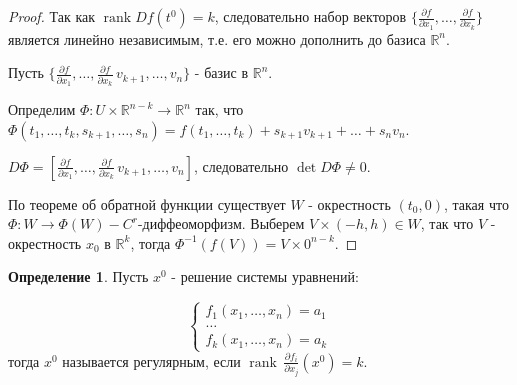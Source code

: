\documentclass[a5paper]{article}
\newcounter{through}
\theoremstyle{plain}
\theoremstyle{definition}
\newtheorem{definition}[through]{Определение}
\numberwithin{through}{section}
\numberwithin{equation}{section}
\DeclareMathOperator{\rank}{rank}
\begin{document}
\begin{proof}
	Так как $\rank Df(t^0) = k$, следовательно набор векторов $\{ \frac{\partial f}{ \partial x_1}, \ldots, \frac{\partial f}{\partial x_k}\}$  является линейно независимым, т.е. его можно дополнить до базиса $\mathbb{R}^n$.
	
	Пусть $\{ \frac{\partial f}{ \partial x_1}, \ldots, \frac{\partial f}{\partial x_k}\, v_{k+1}, \ldots, v_n\}$ - базис в $\mathbb{R}^n$.
	
	Определим $\Phi : U \times \mathbb{R}^{n-k} \to \mathbb{R}^n$ так, что $\Phi(t_1, \ldots, t_k, s_{k+1}, \ldots, s_n)=f(t_1, \ldots, t_k) +s_{k+1}v_{k+1} + \ldots + s_n v_n$.
	
	$D \Phi = [ \frac{\partial f}{ \partial x_1}, \ldots, \frac{\partial f}{\partial x_k}\, v_{k+1}, \ldots, v_n]$, следовательно $\det D \Phi \not= 0$.
	
	По теореме об обратной функции существует $W$ - окрестность $(t_0, 0)$, такая что $\Phi : W \to \Phi(W) - C^r$-диффеоморфизм. Выберем $V \times (-h, h) \in W$, так что $V$ - окрестность $x_0$ в $\mathbb{R}^k$, тогда $\Phi^{-1}(f(V))=V\times{0}^{n-k}$.
	
\end{proof}

\begin{definition}
	Пусть $x^0$ - решение системы уравнений:
	
	\begin{equation*}
	\begin{cases}
	f_1(x_1, \ldots, x_n) = a_1
	\\
	\ldots
	\\
	f_k(x_1, \ldots, x_n) = a_k
	\end{cases}
	\end{equation*}
	тогда $x^0$ называется регулярным, если 
	$\rank \, \frac{\partial f_i}{\partial x_j} (x^0) = k$.
\end{definition}
\end{document}
